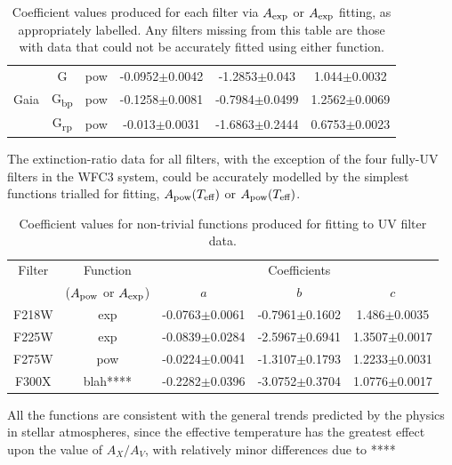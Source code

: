 \documentclass[12pt, a4paper]{report}
\begin{document}
\begin{table}
\begin{center}
\begin{tabular}{cccccc}
& G & pow & -0.0952$\pm$0.0042 & -1.2853$\pm$0.043 & 1.044$\pm$0.0032 \\
Gaia & G\textsubscript{bp} & pow & -0.1258$\pm$0.0081 & -0.7984$\pm$0.0499 & 1.2562$\pm$0.0069 \\
& G\textsubscript{rp} & pow & -0.013$\pm$0.0031 & -1.6863$\pm$0.2444 & 0.6753$\pm$0.0023 \\ \hline

\end{tabular}
\caption{Coefficient values produced for each filter via $A_{\textnormal{exp}}$ or $A_{\textnormal{exp}}$ fitting, as appropriately labelled. Any filters missing from this table are those with data that could not be accurately fitted using either function.}
\label{simpfunc_coeffs_table}
\end{center}
\end{table}

The extinction-ratio data for all filters, with the exception of the four fully-UV filters in the WFC3 system, could be accurately modelled by the simplest functions trialled for fitting, $A_{\textnormal{pow}} (T_{\textnormal{eff}})$ or $A_{\textnormal{pow}} (T_{\textnormal{eff}})$.
\begin{table}
\begin{center}
\begin{tabular}{ccccc}
\hline

Filter &  Function & & Coefficients & \\
 & ($A_{\textnormal{pow}}$ or $A_{\textnormal{exp}}$) & $a$ & $b$ & $c$ \\
\hline
F218W & exp & -0.0763$\pm$0.0061 & -0.7961$\pm$0.1602 & 1.486$\pm$0.0035 \\
F225W & exp & -0.0839$\pm$0.0284 & -2.5967$\pm$0.6941 & 1.3507$\pm$0.0017 \\
F275W & pow & -0.0224$\pm$0.0041 & -1.3107$\pm$0.1793 & 1.2233$\pm$0.0031 \\
F300X & blah**** & -0.2282$\pm$0.0396 & -3.0752$\pm$0.3704 & 1.0776$\pm$0.0017 \\
\hline
\end{tabular}
\caption{Coefficient values for non-trivial functions produced for fitting to UV filter data.}
\label{UV_coeffs_table}
\end{center}
\end{table}

All the functions are consistent with the general trends predicted by the physics in stellar atmospheres, since the effective temperature has the greatest effect upon the value of $A_{X}/A_{V}$, with relatively minor differences due to ****
\end{document}

